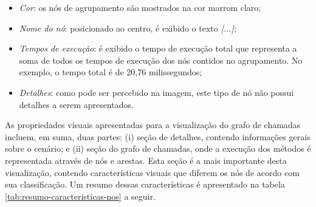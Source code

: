 \begin{itemize}
   \item \textit{Cor}: os nós de agrupamento são mostrados na cor marrom claro;
   \item \textit{Nome do nó}: posicionado ao centro, é exibido o texto \textit{[...]};
   \item \textit{Tempos de execução}: é exibido o tempo de execução total que representa a soma de todos os tempos de execução dos nós contidos no agrupamento. No exemplo, o tempo total é de 20,76 milissegundos;
   \item \textit{Detalhes}: como pode ser percebido na imagem, este tipo de nó não possui detalhes a serem apresentados.
\end{itemize}

As propriedades visuais apresentadas para a visualização do grafo de chamadas incluem, em suma, duas partes: (i) seção de detalhes, contendo informações gerais sobre o cenário; e (ii) seção do grafo de chamadas, onde a execução dos métodos é representada através de nós e arestas. Esta seção é a mais importante desta visualização, contendo características visuais que diferem os nós de acordo com sua classificação. Um resumo dessas características é apresentado na tabela \ref{tab:resumo-caracteristicas-nos} a seguir.

